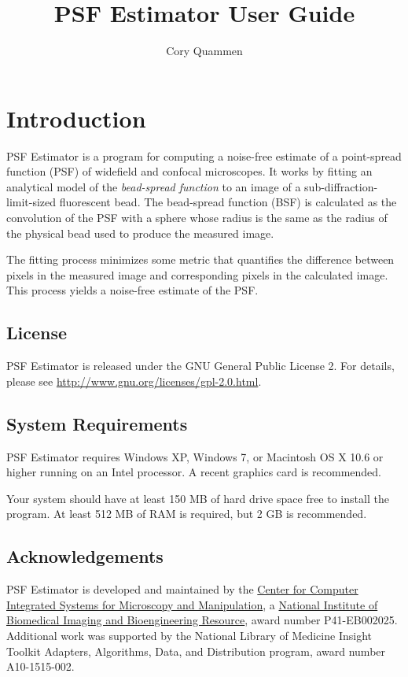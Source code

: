 \documentclass[11pt,titlepage,twoside]{article}
\title{PSF Estimator \ProgramVersion User Guide}
\author{Cory Quammen}
\begin{document}
\maketitle
\tableofcontents
\vfill

\pagebreak

\section{Introduction}

PSF Estimator is a program for computing a noise-free estimate of a point-spread function (PSF) of widefield and confocal microscopes. It works by fitting an analytical model of the \emph{bead-spread function} to an image of a sub-diffraction-limit-sized fluorescent bead. The bead-spread function (BSF) is calculated as the convolution of the PSF with a sphere whose radius is the same as the radius of the physical bead used to produce the measured image.

The fitting process minimizes some metric that quantifies the difference between pixels in the measured image and corresponding pixels in the calculated image. This process yields a noise-free estimate of the PSF.

\subsection{License}

PSF Estimator is released under the GNU General Public License 2. For details, please see \url{http://www.gnu.org/licenses/gpl-2.0.html}.

\subsection{System Requirements}

PSF Estimator \ProgramVersion requires Windows XP, Windows 7, or Macintosh OS X 10.6 or higher running on an Intel processor. A recent graphics card is recommended.

Your system should have at least 150 MB of hard drive space free to install the program. At least 512 MB of RAM is required, but 2 GB is recommended.

\subsection{Acknowledgements}

PSF Estimator \ProgramVersion is developed and maintained by the \href{http://www.cismm.org}{Center for Computer Integrated Systems for Microscopy and Manipulation}, a \href{http://www.nibib.nih.gov/}{National Institute of Biomedical Imaging and Bioengineering Resource}, award number P41-EB002025. Additional work was supported by the National Library of Medicine Insight Toolkit Adapters, Algorithms, Data, and Distribution program, award number A10-1515-002.
\end{document}

